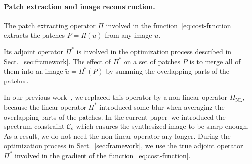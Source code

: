 \paragraph{Patch extraction and image reconstruction.}

The patch extracting operator $\Pi$ involved in the function~\eqref{eq:cost-function} extracts the patches $P=\Pi(u)$ from any image $u$.

Its adjoint operator $\Pi^*$ is involved in the optimization process described in Sect.~\ref{sec:framework}.
The effect of $\Pi^*$ on a set of patches $P$ is to merge all of them into an image $\tilde{u}=\Pi^*(P)$ by summing the overlapping parts of the patches.

In our previous work~\cite{tartavel2013constrained}, we replaced this operator by a non-linear operator $\Pi_\text{NL}$, because the linear operator $\Pi^*$ introduced some blur when averaging the overlapping parts of the patches.
In the current paper, we introduced the spectrum constraint ${\mathcal{C}_{\mathrm{s}}}$ which ensures the synthesized image to be sharp enough.
As a result, we do not need the non-linear operator any longer.
During the optimization process in Sect.~\ref{sec:framework}, we use the true adjoint operator $\Pi^*$ involved in the gradient of the function~\eqref{eq:cost-function}.
